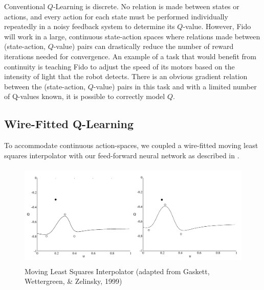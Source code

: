 Conventional $Q$-Learning is discrete. No relation is made between states or actions, and every action for each state must be performed individually repeatedly in a noisy feedback system to determine its $Q$-value. However, Fido will work in a large, continuous state-action spaces where relations made between (state-action, $Q$-value) pairs can drastically reduce the number of reward iterations needed for convergence. An example of a task that would benefit from continuity is teaching Fido to adjust the speed of its motors based on the intensity of light that the robot detects. There is an obvious gradient relation between the (state-action, $Q$-value) pairs in this task and with a limited number of Q-values known, it is possible to correctly model $Q$.

\subsection{Wire-Fitted Q-Learning}

To accommodate continuous action-spaces, we coupled a wire-fitted moving least squares interpolator with our feed-forward neural network as described in \cite{wirefit}.

\begin{figure}[ht]
    \centering
    \includegraphics[height=5cm]{Figures/WireFit.png}
    \caption{Moving Least Squares Interpolator (adapted from Gaskett, Wettergreen, & Zelinsky, 1999)}
\end{figure}
